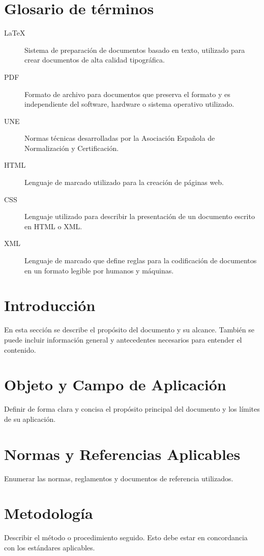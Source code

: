 \documentclass[a4paper,12pt]{article}
\begin{document}
\begin{Form}
\section*{Glosario de términos}

\begin{description}
  \item[LaTeX] Sistema de preparación de documentos basado en texto, utilizado para crear documentos de alta calidad tipográfica.
  \item[PDF] Formato de archivo para documentos que preserva el formato y es independiente del software, hardware o sistema operativo utilizado.
  \item[UNE] Normas técnicas desarrolladas por la Asociación Española de Normalización y Certificación.
  \item[HTML] Lenguaje de marcado utilizado para la creación de páginas web.
  \item[CSS] Lenguaje utilizado para describir la presentación de un documento escrito en HTML o XML.
  \item[XML] Lenguaje de marcado que define reglas para la codificación de documentos en un formato legible por humanos y máquinas.
\end{description}


\newpage

\section{Introducción}
En esta sección se describe el propósito del documento y su alcance. También se puede incluir información general y antecedentes necesarios para entender el contenido.

\section{Objeto y Campo de Aplicación}
Definir de forma clara y concisa el propósito principal del documento y los límites de su aplicación.

\section{Normas y Referencias Aplicables}
Enumerar las normas, reglamentos y documentos de referencia utilizados.


\section{Metodología}
Describir el método o procedimiento seguido. Esto debe estar en concordancia con los estándares aplicables.


\end{Form}
\end{document}
